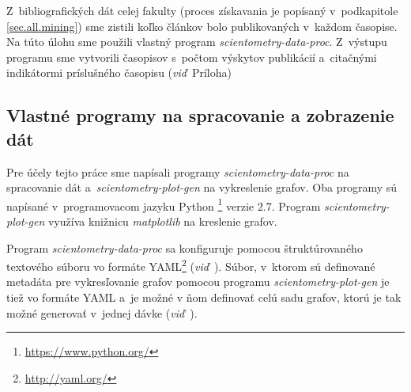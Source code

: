 Z~bibliografických dát celej fakulty (proces získavania je popísaný
v~podkapitole \ref{sec.all.mining}) sme zistili koľko článkov bolo publikovaných
v~každom časopise.  Na túto úlohu sme použili vlastný program
\emph{scientometry-data-proc}.  Z~výstupu programu sme vytvorili časopisov
s~počtom výskytov publikácií a~citačnými indikátormi príslušného časopisu
(\emph{viď}~Príloha)

\subsection{Vlastné programy na spracovanie a zobrazenie dát}
\label{sec:program.my}

Pre účely tejto práce sme napísali programy \emph{scientometry-data-proc} na
spracovanie dát a~\emph{scientometry-plot-gen} na vykreslenie grafov.  Oba
programy sú napísané v~programovacom jazyku Python%
\footnote{\url{https://www.python.org/}} verzie 2.7.  Program
\emph{scientometry-plot-gen} využíva knižnicu \emph{matplotlib} na kreslenie
grafov.

Program \emph{scientometry-data-proc} sa konfiguruje pomocou štruktúrovaného
textového súboru vo formáte YAML\footnote{\url{http://yaml.org/}}
(\emph{viď}~).  Súbor, v~ktorom sú definované metadáta
pre vykresľovanie grafov pomocou programu \emph{scientometry-plot-gen} je tiež
vo formáte YAML a~je možné v ňom definovať celú sadu grafov, ktorú je tak možné
generovať v~jednej dávke (\emph{viď}~).


